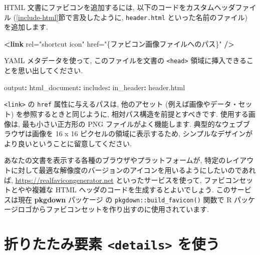 \documentclass[
  11pt,
  lualatex,
  ja=standard]{bxjsreport}
\newenvironment{Shaded}{\begin{snugshade}}{\end{snugshade}}
\newcommand{\AttributeTok}[1]{\textcolor[rgb]{0.77,0.63,0.00}{#1}}
\newcommand{\FunctionTok}[1]{\textcolor[rgb]{0.00,0.00,0.00}{#1}}
\newcommand{\KeywordTok}[1]{\textcolor[rgb]{0.13,0.29,0.53}{\textbf{#1}}}
\newcommand{\OtherTok}[1]{\textcolor[rgb]{0.56,0.35,0.01}{#1}}
\newcommand{\StringTok}[1]{\textcolor[rgb]{0.31,0.60,0.02}{#1}}
\begin{document}
HTML 文書にファビコンを追加するには, 以下のコードをカスタムヘッダファイル (\ref{include-html}節で言及したように, \texttt{header.html} といった名前のファイル) を追加します.

\begin{Shaded}
\begin{Highlighting}[]
\KeywordTok{\textless{}link}\OtherTok{ rel=}\StringTok{"shortcut icon"}\OtherTok{ href=}\StringTok{"\{ファビコン画像ファイルへのパス\}"} \KeywordTok{/\textgreater{}}
\end{Highlighting}
\end{Shaded}

YAML メタデータを使って, このファイルを文書の \texttt{\textless{}head\textgreater{}} 領域に挿入できることを思い出してください.

\begin{Shaded}
\begin{Highlighting}[]
\FunctionTok{output}\KeywordTok{:}
\AttributeTok{  }\FunctionTok{html\_document}\KeywordTok{:}
\AttributeTok{    }\FunctionTok{includes}\KeywordTok{:}
\AttributeTok{      }\FunctionTok{in\_header}\KeywordTok{:}\AttributeTok{ header.html}
\end{Highlighting}
\end{Shaded}

\texttt{\textless{}link\textgreater{}} の \texttt{href} 属性に与えるパスは, 他のアセット (例えば画像やデータ・セット) を参照するときと同じように, 相対パス構造を前提とすべきです. 使用する画像は, 最も小さい正方形の PNG ファイルがよく機能します. 典型的なウェブブラウザは画像を 16 x 16 ピクセルの領域に表示するため, シンプルなデザインがより良いということに留意してください.

あなたの文書を表示する各種のブラウザやプラットフォームが, 特定のレイアウトに対して最適な解像度のバージョンのアイコンを用いるようにしたいのであれば, \url{https://realfavicongenerator.net} といったサービスを使って, ファビコンセットとやや複雑な HTML ヘッダのコードを生成するとよいでしょう. このサービスは現在 \textbf{pkgdown} パッケージ \autocite{R-pkgdown} の \texttt{pkgdown::build\_favicon()} 関数で R パッケージロゴからファビコンセットを作り出すのに使用されています.

\hypertarget{details-tag}{%
\section{\texorpdfstring{折りたたみ要素 \texttt{\textless{}details\textgreater{}} を使う}{折りたたみ要素 \textless details\textgreater{} を使う}}\label{details-tag}}
\end{document}
